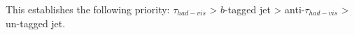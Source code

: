  This establishes the following priority: $\tau_{had-vis}$ > $b$-tagged jet > anti-$\tau_{had-vis}$ > un-tagged jet.
\label{sec:overlap}

